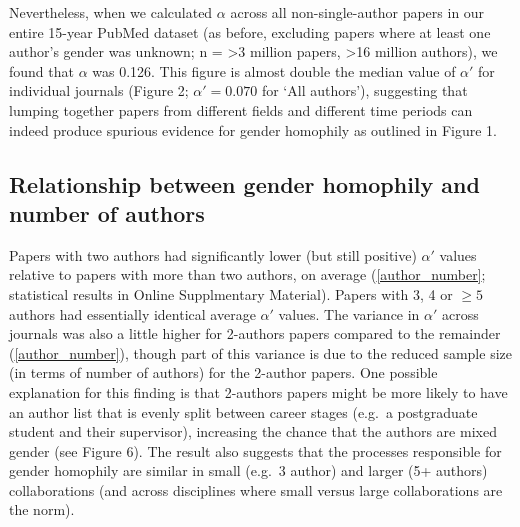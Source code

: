 \documentclass[12pt,]{article}
\begin{document}
Nevertheless, when we calculated \(\alpha\) across all non-single-author
papers in our entire 15-year PubMed dataset (as before, excluding papers
where at least one author's gender was unknown; n = \textgreater{}3
million papers, \textgreater{}16 million authors), we found that
\(\alpha\) was 0.126. This figure is almost double the median value of
\(\alpha'\) for individual journals (Figure 2; \(\alpha' = 0.070\) for
`All authors'), suggesting that lumping together papers from different
fields and different time periods can indeed produce spurious evidence
for gender homophily as outlined in Figure 1.

\subsection{Relationship between gender homophily and number of
authors}\label{relationship-between-gender-homophily-and-number-of-authors}

Papers with two authors had significantly lower (but still positive)
\(\alpha'\) values relative to papers with more than two authors, on
average (\autoref{author_number}; statistical results in Online
Supplmentary Material). Papers with 3, 4 or \(\ge5\) authors had
essentially identical average \(\alpha'\) values. The variance in
\(\alpha'\) across journals was also a little higher for 2-authors
papers compared to the remainder (\autoref{author_number}), though part
of this variance is due to the reduced sample size (in terms of number
of authors) for the 2-author papers. One possible explanation for this
finding is that 2-authors papers might be more likely to have an author
list that is evenly split between career stages (e.g.~a postgraduate
student and their supervisor), increasing the chance that the authors
are mixed gender (see Figure 6). The result also suggests that the
processes responsible for gender homophily are similar in small (e.g.~3
author) and larger (5+ authors) collaborations (and across disciplines
where small versus large collaborations are the norm).
\end{document}
